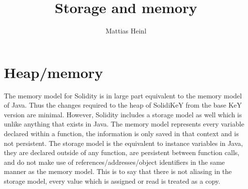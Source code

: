 \documentclass{article}
\title{Storage and memory}
\author{Mattias Heinl}
\date{}
\begin{document}
	\maketitle
	
	\section{Heap/memory}
	The memory model for Solidity is in large part equivalent to the memory model of Java. Thus the changes required to the heap of SolidiKeY from the base KeY version are minimal. However, Solidity includes a storage model as well which is unlike anything that exists in Java. The memory model represents every variable declared within a function, the information is only saved in that context and is not persistent. The storage model is the equivalent to instance variables in Java, they are declared outside of any function, are persistent between function calls, and do not make use of references/addresses/object identifiers in the same manner as the memory model. This is to say that there is not aliasing in the storage model, every value which is assigned or read is treated as a copy. 
	
\end{document}
